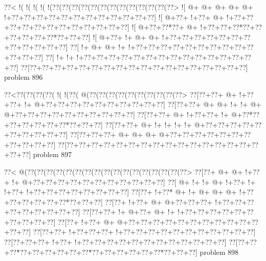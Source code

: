 \vbox{\vbox{\goo
\0??<\- !(\- !(\- !(\- !(\- !(\0??(\0??(\0??(\0??(\0??(\0??(\0??(\0??(\0??(\0??(\0??(\0??(\0??>
\- ![\- @+\- @+\- @+\- @+\- @+\- !+\0??+\0??+\0??+\0??+\0??+\0??+\0??+\0??+\0??+\0??+\0??+\0??]
\- ![\- @+\0??+\- !+\0??+\- @+\- !+\0??+\0??+\0??+\0??+\0??+\0??+\0??+\0??+\0??+\0??+\0??+\0??]
\- ![\- @+\0??+\0??*\0??+\- @+\- !+\0??+\0??+\0??*\0??+\0??+\0??+\0??+\0??+\0??*\0??+\0??+\0??]
\- ![\- @+\0??+\- !+\- @+\- @+\- !+\0??+\0??+\0??+\0??+\0??+\0??+\0??+\0??+\0??+\0??+\0??+\0??]
\0??[\- !+\- @+\- @+\- !+\- !+\0??+\0??+\0??+\0??+\0??+\0??+\0??+\0??+\0??+\0??+\0??+\0??+\0??]
\0??[\- !+\- !+\- !+\0??+\0??+\0??+\0??+\0??+\0??+\0??+\0??+\0??+\0??+\0??+\0??+\0??+\0??+\0??]
\0??[\0??+\0??+\0??+\0??+\0??+\0??+\0??+\0??+\0??+\0??+\0??+\0??+\0??+\0??+\0??+\0??+\0??+\0??]
}
\hfil problem 896\hfil\break
}



\vbox{\vbox{\goo
\0??<\0??(\0??(\0??(\0??(\- !(\- !(\0??(\- @(\0??(\0??(\0??(\0??(\0??(\0??(\0??(\0??(\0??(\0??>
\0??[\0??+\0??+\- @+\- !+\0??+\0??+\- !+\- @+\0??+\0??+\0??+\0??+\0??+\0??+\0??+\0??+\0??+\0??]
\0??[\0??+\0??+\- @+\- @+\- !+\- !+\- @+\- @+\0??+\0??+\0??+\0??+\0??+\0??+\0??+\0??+\0??+\0??]
\0??[\0??+\0??+\- @+\- !+\0??+\0??+\- !+\- @+\0??*\0??+\0??+\0??+\0??+\0??+\0??*\0??+\0??+\0??]
\0??[\0??+\0??+\- @+\- !+\- !+\- !+\- !+\- @+\0??+\0??+\0??+\0??+\0??+\0??+\0??+\0??+\0??+\0??]
\0??[\0??+\0??+\0??+\- @+\- @+\- @+\- @+\0??+\0??+\0??+\0??+\0??+\0??+\0??+\0??+\0??+\0??+\0??]
\0??[\0??+\0??+\0??+\0??+\0??+\0??+\0??+\0??+\0??+\0??+\0??+\0??+\0??+\0??+\0??+\0??+\0??+\0??]
}
\hfil problem 897\hfil\break
}



\vbox{\vbox{\goo
\0??<\- @(\0??(\0??(\0??(\0??(\0??(\0??(\0??(\0??(\0??(\0??(\0??(\0??(\0??(\0??(\0??(\0??(\0??>
\0??[\0??+\- @+\- @+\- !+\0??+\- !+\- @+\0??+\0??+\0??+\0??+\0??+\0??+\0??+\0??+\0??+\0??+\0??]
\0??[\- @+\- !+\- !+\- @+\- !+\0??+\- !+\- !+\0??+\- !+\0??+\0??+\0??+\0??+\0??+\0??+\0??+\0??]
\0??[\0??+\- !+\0??*\- @+\- !+\- @+\- @+\- @+\- !+\0??+\0??+\0??+\0??+\0??+\0??*\0??+\0??+\0??]
\0??[\0??+\- !+\0??+\- @+\- @+\0??+\0??+\0??+\- !+\0??+\0??+\0??+\0??+\0??+\0??+\0??+\0??+\0??]
\0??[\0??+\0??+\- !+\- @+\0??+\- @+\- !+\- !+\0??+\0??+\0??+\0??+\0??+\0??+\0??+\0??+\0??+\0??]
\0??[\0??+\- !+\0??+\- @+\- @+\0??+\0??+\0??+\0??+\0??+\0??+\0??+\0??+\0??+\0??+\0??+\0??+\0??]
\0??[\0??+\0??+\- !+\0??+\0??+\0??+\- !+\0??+\0??+\0??+\0??+\0??+\0??+\0??+\0??+\0??+\0??+\0??]
\0??[\0??+\0??+\0??+\- !+\0??+\- !+\0??+\0??+\0??+\0??+\0??+\0??+\0??+\0??+\0??+\0??+\0??+\0??]
\0??[\0??+\0??+\0??*\0??+\0??+\0??+\0??+\0??+\0??*\0??+\0??+\0??+\0??+\0??+\0??*\0??+\0??+\0??]
}
\hfil problem 898\hfil\break
}



